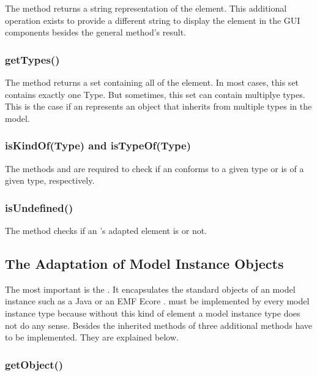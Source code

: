 The method  returns a string representation of the element. This additional operation exists to provide a different string to display the element in the \acs{GUI} components besides the general  method's result.

\subsubsection{getTypes()}

The method  returns a set containing all  of the element. In most cases, this set contains exactly one Type. But sometimes, this set can contain multiplye types. This is the case if an  represents an object that inherits from multiple types in the model.

\subsubsection{isKindOf(Type) and isTypeOf(Type)}

The methods  and  are required to check if an  conforms to a given type or is of a given type, respectively.

\subsubsection{isUndefined()}

The method  checks if an 's adapted element is  or not.


\subsection{The Adaptation of Model Instance Objects}

The most important  is the . It encapsulates the standard objects of an model instance such as a Java  or an \acs{EMF} Ecore .  must be implemented by every model instance type because without this kind of element a model instance type does not do any sense. Besides the inherited methods of  three additional methods have to be implemented. They are explained below.

\subsubsection{getObject()}

